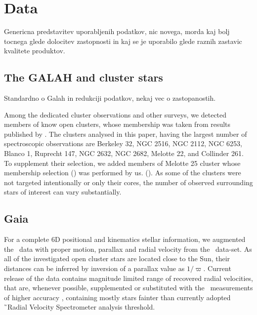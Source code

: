 
\section{Data}
\label{sec:data_clusters}
Genericna predstavitev uporabljenih podatkov, nic novega, morda kaj bolj tocnega glede dolocitev zastopnosti in kaj se je uporabilo glede raznih zastavic kvalitete produktov. 

\subsection{The GALAH and cluster stars}
\label{sec:galah_clusters}
Standardno o Galah in redukciji podatkov, nekaj vec o zastopanostih.

Among the dedicated cluster observations and other surveys, we detected members of know open clusters, whose membership was taken from results published by \citet{2018A&A...618A..93C}. The clusters analysed in this paper, having the largest number of spectroscopic observations are Berkeley 32, NGC 2516, NGC 2112, NGC 6253, Blanco 1, Ruprecht 147, NGC 2632, NGC 2682,  Melotte 22, and Collinder 261. To supplement their selection, we added members of Melotte 25 cluster whose membership selection () was performed by us. (). As some of the clusters were not targeted intentionally or only their cores, the number of observed surrounding stars of interest can vary substantially.  

\subsection{Gaia}
\label{sec:gaia_clusters}
For a complete 6D positional and kinematics stellar information, we augmented the \Gh\ data with proper motion, parallax and radial velocity from the \Gs\ data-set. As all of the investigated open cluster stars are located close to the Sun, their distances can be inferred by inversion of a parallax value as $1 / \varpi$. Current release of the data contains magnitude limited range of recovered radial velocities, that are, whenever possible, supplemented or substituted with the \Gh\ measurements of higher accuracy \citep{2018arXiv180406344Z}, containing mostly stars fainter than currently adopted \G\ Radial Velocity Spectrometer \citep[RVS,][]{2018A&A...616A...5C} analysis threshold.

